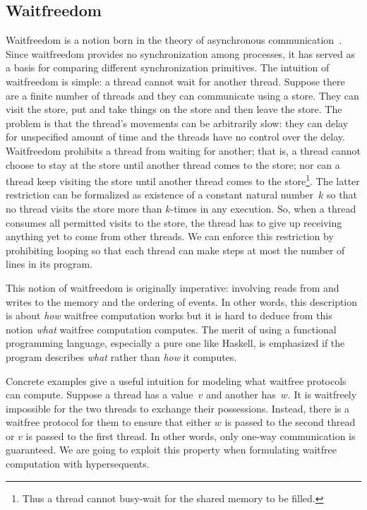 \subsection{Waitfreedom}
\label{subsect:wf}

Waitfreedom is a notion born in the theory of asynchronous
communication~\citep{lamport1979make,Herlihy99,Saks:1993vq}. Since
waitfreedom provides no synchronization among processes, it has
served as a basis for comparing different synchronization primitives.
The intuition of waitfreedom is simple: a thread cannot
wait for another thread.  Suppose there are a finite number of threads and they can
communicate using a store. They can
visit the store, put and take things on the store and then leave the
store. The problem is that the thread's movements can be arbitrarily
slow: they can delay for unspecified amount of time and the threads
have no control over the delay. Waitfreedom prohibits a thread from
waiting for another; that is, a thread cannot choose to stay at the
store until another thread comes to the store; nor can a thread
keep visiting the store until another thread comes to the
store\footnote{Thus a thread cannot busy-wait for the shared memory to
be filled.}.
The
latter restriction can be formalized as existence of a constant natural
number~$k$ so
that no thread visits the store more than
$k$-times in any execution.  So, when a thread consumes all permitted
visits to the store, the thread has to give up receiving anything yet to come
from other threads.  We can
enforce this restriction by prohibiting
looping so that each thread can make steps at most the number of lines
in its program.

This notion of waitfreedom is originally imperative: involving reads from and writes to
the memory and the ordering of events.  In other words, this description
is about
\textit{how} waitfree computation works but it is hard to deduce from
this notion \textit{what} waitfree computation computes.
The merit of using a functional programming language, especially a pure
one like Haskell, is emphasized if the program describes \textit{what}
rather than \textit{how} it computes.

Concrete examples give a useful intuition for modeling what waitfree
protocols can compute.
Suppose a thread has a value~$v$ and another has~$w$.
It is waitfreely impossible for the two threads to exchange their
possessions.  Instead, there is a waitfree protocol for them to ensure
that either $w$ is passed to the second thread or $v$ is passed to the
first thread.
In other words, only one-way communication is guaranteed.  We are going
to exploit this property when formulating waitfree computation with hypersequents.


